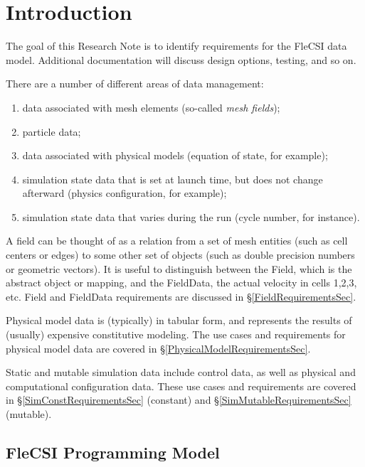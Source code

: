 \section{Introduction}
The goal of this Research Note is to identify requirements for the FleCSI data model.
Additional documentation will discuss design options, testing, and so on.

There are a number of different areas of data management:
\begin{enumerate}
\item data associated with mesh elements (so-called \emph{mesh fields});
\item particle data;
\item data associated with physical models (equation of state, for example);
\item simulation state data that is set at launch time, but does not change afterward (physics configuration, for example);
\item simulation state data that varies during the run (cycle number, for instance).
\end{enumerate}

A field can be thought of as a relation from a set of mesh entities (such as cell centers or edges) to some other set of objects (such as double precision numbers or geometric vectors).
It is useful to distinguish between the Field, which is the abstract object or mapping, and the FieldData, the actual velocity in cells 1,2,3, etc.
Field and FieldData requirements are discussed in \S\ref{FieldRequirementsSec}.

Physical model data is (typically) in tabular form, and represents the results of (usually) expensive constitutive modeling.
The use cases and requirements for physical model data are covered in \S\ref{PhysicalModelRequirementsSec}.

Static and mutable simulation data include control data, as well as physical and computational configuration data.
These use cases and requirements are covered in \S\ref{SimConstRequirementsSec} (constant) and \S\ref{SimMutableRequirementsSec} (mutable).

\subsection{FleCSI Programming Model}

